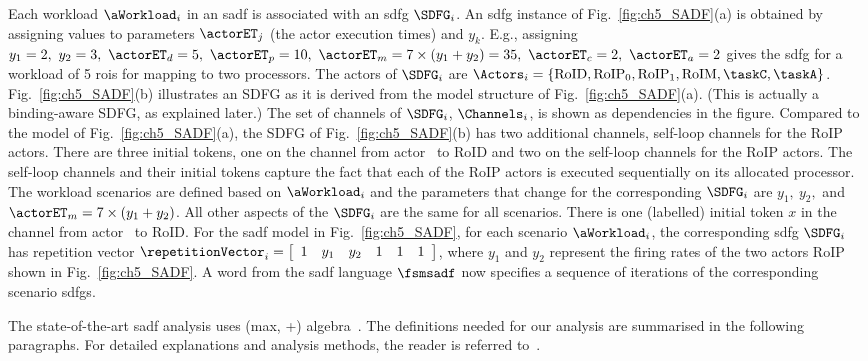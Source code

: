 Each workload $\aWorkload_i$ in an \gls{sadf} is associated with an \gls{sdfg} $\SDFG_i$. 
An \gls{sdfg} instance of Fig.~\ref{fig:ch5_SADF}(a) is obtained by assigning values to parameters $\actorET_j$ (the actor execution times) and $y_k$. 
E.g., assigning $y_1=2,\ y_2=3,\ \actorET_d=5,\ \actorET_p=10,\ \actorET_m=7\times(y_1+y_2)=35,\ \actorET_c=2,\ \actorET_a=2$ gives the \gls{sdfg} for a workload of 5 \glspl{roi} for mapping to two processors.
The actors of $\SDFG_i$ are $\Actors_i=\{\text{RoID}, \text{RoIP}_0, \text{RoIP}_1, \text{RoIM}, \text{\taskC}, \text{\taskA}\}$. Fig.\ \ref{fig:ch5_SADF}(b) illustrates an SDFG as it is derived from the model structure of Fig.\ \ref{fig:ch5_SADF}(a). (This is actually a binding-aware SDFG, as explained later.) The set of channels of $\SDFG_i$, $\Channels_i$, is shown as dependencies in the figure. Compared to the model of Fig.\ \ref{fig:ch5_SADF}(a), the SDFG of Fig.\ \ref{fig:ch5_SADF}(b) has two additional channels, self-loop channels for the RoIP actors. There are three initial tokens, one on the channel from actor \taskA\ to RoID and two on the self-loop channels for the RoIP actors. The self-loop channels and their initial tokens capture the fact that each of the RoIP actors is executed sequentially on its allocated processor.
The workload scenarios are defined based on $\aWorkload_i$ and the parameters that change for the corresponding $\SDFG_i$ are $y_1,\ y_2,$ and $\actorET_m=7\times (y_1+y_2)$. All other aspects of the $\SDFG_i$ are the same for all scenarios.
There is one (labelled) initial token $x$ in the channel from actor \taskA\ to RoID.
For the \gls{sadf} model in Fig.~\ref{fig:ch5_SADF}, for each scenario $\aWorkload_i$,
the corresponding \gls{sdfg} $\SDFG_i$ has repetition vector $\repetitionVector_i= \left[ \begin{array}{cccccc} 1 & y_1 & y_2 & 1 & 1 & 1  \end{array} \right]$, where $y_1$ and $y_2$ represent the firing rates of the two actors RoIP shown in Fig.~\ref{fig:ch5_SADF}. A word from the \gls{sadf} language $\fsmsadf$ now specifies a sequence of iterations of the corresponding scenario \glspl{sdfg}.

The state-of-the-art \gls{sadf} analysis uses (max, +) algebra~\cite{baccelli1992synchronization}.
The definitions needed for our analysis are summarised in the following paragraphs. For detailed explanations and analysis methods, the reader is referred to~\cite{ara2018scalable}.

